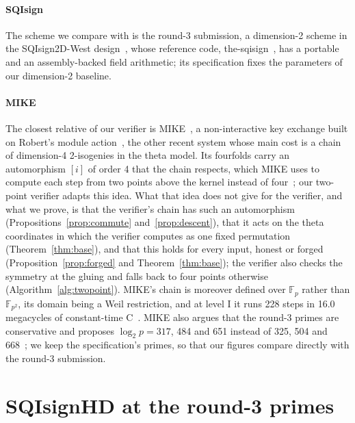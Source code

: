 \documentclass[version=preprint]{iacrcc}
\begin{document}
    \paragraph{SQIsign}
    The scheme we compare with is the round-3 submission, a dimension-2 scheme
    in the SQIsign2D-West design~\cite{BDF+24,AAA+26}, whose reference code,
    the-sqisign~\cite{SQI26}, has a portable and an assembly-backed field
    arithmetic; its specification fixes the parameters of our dimension-2
    baseline.

    \paragraph{MIKE}
    The closest relative of our verifier is MIKE~\cite{BDD+26}, a
    non-interactive key exchange built on Robert's module
    action~\cite{Rob24b}, the other recent system whose main cost is a chain
    of dimension-4 2-isogenies in the theta model. Its fourfolds carry an
    automorphism $[i]$ of order 4 that the chain respects, which MIKE uses to
    compute each step from two points above the kernel instead of
    four~\cite[Appendix E.2]{BDD+26}; our two-point verifier adapts this idea.
    What that idea does not give for the verifier, and what we prove, is that
    the verifier's chain has such an automorphism
    (Propositions~\ref{prop:commute} and~\ref{prop:descent}), that it acts on
    the theta coordinates in which the verifier computes as one fixed
    permutation (Theorem~\ref{thm:base}), and that this holds for every
    input, honest or forged (Proposition~\ref{prop:forged} and
    Theorem~\ref{thm:base}); the verifier also checks the symmetry at the
    gluing and falls back to four points otherwise
    (Algorithm~\ref{alg:twopoint}).
    MIKE's chain is moreover defined over $\mathbb{F}_p$ rather than
    $\mathbb{F}_{p^2}$, its domain being a Weil restriction, and at level I it
    runs 228 steps in 16.0 megacycles of constant-time C~\cite[Table
    1]{BDD+26}. MIKE also argues that the round-3 primes are conservative and
    proposes $\log_2 p = 317$, 484 and 651 instead of 325, 504 and
    668~\cite[Section 4.5]{BDD+26}; we keep the specification's primes, so
    that our figures compare directly with the round-3 submission.

    \section{SQIsignHD at the round-3 primes}
    \label{sec:dim4}
\end{document}
